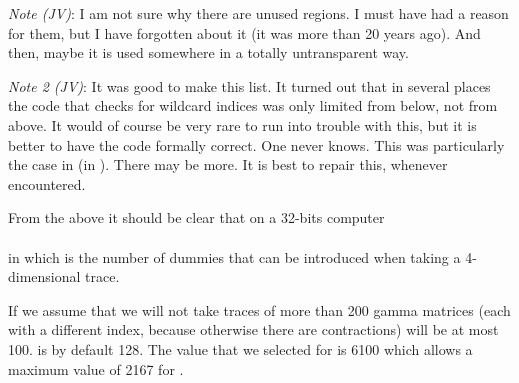 {\it Note (JV)}: I am not sure why there are unused regions. I must have had a 
reason for them, but I have forgotten about it (it was more than 20 years 
ago). And then, maybe it is used somewhere in a totally untransparent way.

{\it Note 2 (JV)}: It was good to make this list. It turned out that in several 
places the code that checks for wildcard indices was only limited from 
below, not from above. It would of course be very rare to run into trouble 
with this, but it is better to have the code formally correct. One never 
knows. This was particularly the case in  (in ). There may 
be more. It is best to repair this, whenever encountered.

From the above it should be clear that on a 32-bits computer \\
 \\
in which  is the number of dummies that can be introduced when 
taking a 4-dimensional trace.

If we assume that we will not take traces of more than 200 gamma matrices 
(each with a different index, because otherwise there are contractions) 
 will be at most 100.  is by default 128.
The value that we selected for  is 6100 which allows a maximum 
value of 2167 for .
